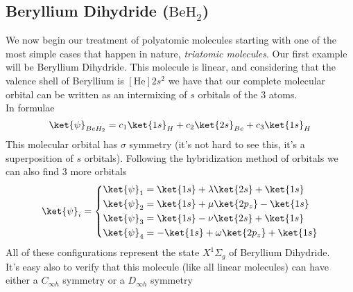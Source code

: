 \documentclass[a4paper, 11pt]{book}
\newcommand{\1}{\opr{\mathds{1}}}
\theoremstyle{plain}
\begin{document}
	\subsection{Beryllium Dihydride ($\mathrm{BeH_2}$)}
	We now begin our treatment of polyatomic molecules starting with one of the most simple cases that happen in nature, \textit{triatomic molecules}. Our first example will be Beryllium Dihydride. This molecule is linear, and considering that the valence shell of Beryllium is $[\mathrm{He}]2s^2$ we have that our complete molecular orbital can be written as an intermixing of $s$ orbitals of the 3 atoms.\\
	In formulae
	\begin{equation}
		\ket{\psi}_{BeH_2}=c_1\ket{1s}_H+c_2\ket{2s}_{Be}+c_3\ket{1s}_H
		\label{eq:psibeh2}
	\end{equation}
	This molecular orbital has $\sigma$ symmetry (it's not hard to see this, it's a superposition of $s$ orbitals). Following the hybridization method of orbitals we can also find 3 more orbitals
	\begin{equation}
		\ket{\psi}_i=\left\{\begin{aligned}
			\ket{\psi}_1&=\ket{1s}+\lambda\ket{2s}+\ket{1s}\\
			\ket{\psi}_2&=\ket{1s}+\mu\ket{2p_z}-\ket{1s}\\
			\ket{\psi}_3&=\ket{1s}-\nu\ket{2s}+\ket{1s}\\
			\ket{\psi}_4&=-\ket{1s}+\omega\ket{2p_z}+\ket{1s}
		\end{aligned}\right.
		\label{eq:beh2orbitals}
	\end{equation}
	All of these configurations represent the state $X^1\Sigma_g$ of Beryllium Dihydride.\\
	It's easy also to verify that this molecule (like all linear molecules) can have either a $C_{\infty h}$ symmetry or a $D_{\infty h}$ symmetry
\end{document}
